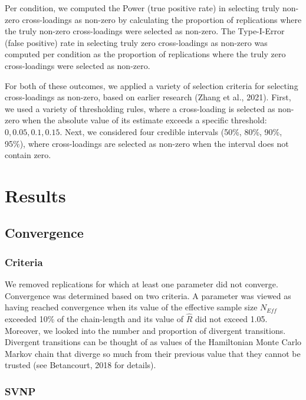 \documentclass[
  man, donotrepeattitle,floatsintext]{apa6}
\begin{document}
Per condition, we computed the Power (true positive rate) in selecting truly non-zero cross-loadings as non-zero by calculating the proportion of replications where the truly non-zero cross-loadings were selected as non-zero. The Type-I-Error (false positive) rate in selecting truly zero cross-loadings as non-zero was computed per condition as the proportion of replications where the truly zero cross-loadings were selected as non-zero.

For both of these outcomes, we applied a variety of selection criteria for selecting cross-loadings as non-zero, based on earlier research (Zhang et al., 2021). First, we used a variety of thresholding rules, where a cross-loading is selected as non-zero when the absolute value of its estimate exceeds a specific threshold: \(0, 0.05, 0.1, 0.15\). Next, we considered four credible intervals (50\%, 80\%, 90\%, 95\%), where cross-loadings are selected as non-zero when the interval does not contain zero.

\hypertarget{results}{%
\section{Results}\label{results}}

\hypertarget{convergence}{%
\subsection{Convergence}\label{convergence}}

\hypertarget{criteria}{%
\subsubsection{Criteria}\label{criteria}}

We removed replications for which at least one parameter did not converge. Convergence was determined based on two criteria. A parameter was viewed as having reached convergence when its value of the effective sample size \(N_{Eff}\) exceeded 10\% of the chain-length and its value of \(\hat{R}\) did not exceed 1.05.
Moreover, we looked into the number and proportion of divergent transitions. Divergent transitions can be thought of as values of the Hamiltonian Monte Carlo Markov chain that diverge so much from their previous value that they cannot be trusted (see Betancourt, 2018 for details).

\hypertarget{svnp}{%
\subsubsection{SVNP}\label{svnp}}
\end{document}
